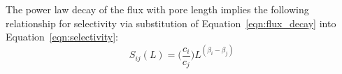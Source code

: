 \documentclass[12pt]{article}
\begin{document}
%  
  


  
  The power law decay of the flux with pore length implies the following relationship
  for selectivity via substitution of Equation~\ref{eqn:flux_decay} into 
  Equation~\ref{eqn:selectivity}:
  \begin{equation}
  S_{ij}(L) = \bigg(\frac{c_i}{c_j}\bigg)L^{(\beta_i - \beta_j)}
  \label{eqn:selectivity_ratio}
  \end{equation}
  
\end{document}
